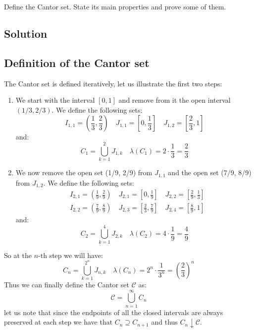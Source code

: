 \sheet 


\question

Define the Cantor set. State its main properties and prove some of them.

\subsection*{Solution}

\subsection{Definition of the Cantor set}
The Cantor set is defined iteratively, let us illustrate the first two steps:
\begin{enumerate}[Step 1:]
    \item We start with the interval $[0,1]$ and remove from it the open interval $(1/3, 2/3)$. We define the following sets:
        \[
            I_{1,1} = \left(\frac{1}{3}, \frac{2}{3} \right) \quad J_{1,1} = \left[0, \frac{1}{3} \right] \quad J_{1,2} = \left[\frac{2}{3}, 1 \right]
        \]
        and:
        \[
            C_1 = \bigcup_{k=1}^2 J_{1,k} \quad \lambda(C_1) = 2\cdot \frac{1}{3} = \frac{2}{3}
        \]
    \item We now remove the open set (1/9, 2/9) from $J_{1,1}$ and the open set (7/9, 8/9) from $J_{1,2}$. We define the following sets:
        \begin{align*}
            & I_{2,1} = \left(\frac{1}{9}, \frac{2}{9} \right) \quad J_{2,1} = \left[0, \frac{1}{9} \right] \quad J_{2,2} = \left[\frac{2}{9}, \frac{1}{3} \right] \\
            & I_{2,2} = \left(\frac{7}{9}, \frac{8}{9} \right) \quad J_{2,3} = \left[\frac{2}{3}, \frac{7}{9} \right] \quad J_{2,4} = \left[\frac{8}{9}, 1 \right]
        \end{align*}
        and:
        \[
            C_2 = \bigcup_{k=1}^4 J_{2,k} \quad \lambda(C_2) = 4\cdot \frac{1}{9} = \frac{4}{9}
        \]
\end{enumerate}
So at the $n$-th step we will have:
\[
    C_n = \bigcup_{k=1}^{2^n} J_{n,k} \quad \lambda(C_n) = 2^n \cdot \frac{1}{3^n} = \left( \frac{2}{3} \right)^n  
\]
Thus we can finally define the Cantor set $\mathcal{C}$ as:
\[
    \mathcal{C} = \bigcup_{n=1}^\infty C_n
\]
let us note that since the endpoints of all the closed intervals are always preserved at each step we have that $C_n \supseteq C_{n+1}$ and thus $C_n \downarrow \mathcal{C}$.

